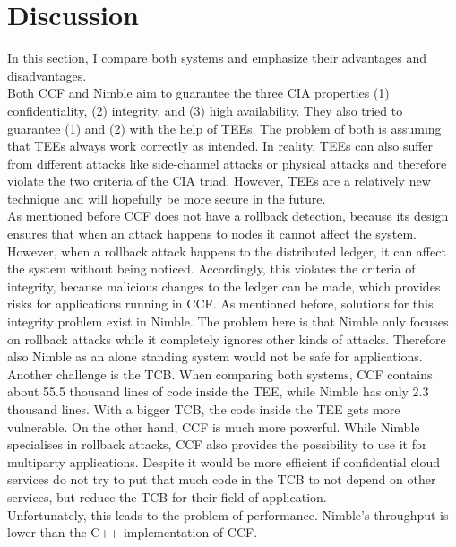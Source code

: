 \section{Discussion}
\label{challenges:ccf}
In this section, I compare both systems and emphasize their advantages and disadvantages.\\
Both CCF and Nimble aim to guarantee the three CIA properties (1) confidentiality, (2) integrity, and (3) high availability. They also tried to guarantee (1) and (2) with the help of TEEs. The problem of both is assuming that TEEs always work correctly as intended. In reality, TEEs can also suffer from different attacks like side-channel attacks or physical attacks and therefore violate the two criteria of the CIA triad. However, TEEs are a relatively new technique and will hopefully be more secure in the future.\\
As mentioned before CCF does not have a rollback detection, because its design ensures that when an attack happens to nodes it cannot affect the system. However, when a rollback attack happens to the distributed ledger, it can affect the system without being noticed. Accordingly, this violates the criteria of integrity, because malicious changes to the ledger can be made, which provides risks for applications running in CCF.
As mentioned before, solutions for this integrity problem exist in Nimble. The problem here is that Nimble only focuses on rollback attacks while it completely ignores other kinds of attacks. Therefore also Nimble as an alone standing system would not be safe for applications.\\
Another challenge is the TCB. When comparing both systems, CCF contains about 55.5 thousand lines of code inside the TEE, while Nimble has only 2.3 thousand lines. With a bigger TCB, the code inside the TEE gets more vulnerable. On the other hand, CCF is much more powerful. While Nimble specialises in rollback attacks, CCF also provides the possibility to use it for multiparty applications.  Despite it would be more efficient if confidential cloud services do not try to put that much code in the TCB to not depend on other services, but reduce the TCB for their field of application.\\
 Unfortunately, this leads to the problem of performance. Nimble's throughput is lower than the C++ implementation of CCF. \\
  

